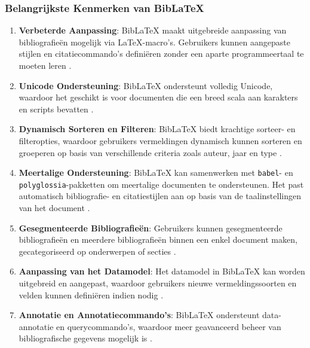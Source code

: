 \subsubsection{Belangrijkste Kenmerken van BibLaTeX}
\begin{enumerate}
    \item \textbf{Verbeterde Aanpassing}: BibLaTeX maakt uitgebreide aanpassing van bibliografieën mogelijk via \LaTeX{}-macro's. Gebruikers kunnen aangepaste stijlen en citatiecommando's definiëren zonder een aparte programmeertaal te moeten leren \autocite{Kime2024}.
    \item \textbf{Unicode Ondersteuning}: BibLaTeX ondersteunt volledig Unicode, waardoor het geschikt is voor documenten die een breed scala aan karakters en scripts bevatten \autocite{Kime2024}.
    \item \textbf{Dynamisch Sorteren en Filteren}: BibLaTeX biedt krachtige sorteer- en filteropties, waardoor gebruikers vermeldingen dynamisch kunnen sorteren en groeperen op basis van verschillende criteria zoals auteur, jaar en type \autocite{Kime2024}.
    \item \textbf{Meertalige Ondersteuning}: BibLaTeX kan samenwerken met \texttt{babel}- en \texttt{polyglossia}-pakketten om meertalige documenten te ondersteunen. Het past automatisch bibliografie- en citatiestijlen aan op basis van de taalinstellingen van het document \autocite{Kime2024}.
    \item \textbf{Gesegmenteerde Bibliografieën}: Gebruikers kunnen gesegmenteerde bibliografieën en meerdere bibliografieën binnen een enkel document maken, gecategoriseerd op onderwerpen of secties \autocite{Kime2024}.
    \item \textbf{Aanpassing van het Datamodel}: Het datamodel in BibLaTeX kan worden uitgebreid en aangepast, waardoor gebruikers nieuwe vermeldingssoorten en velden kunnen definiëren indien nodig \autocite{Kime2024}.
    \item \textbf{Annotatie en Annotatiecommando's}: BibLaTeX ondersteunt data-annotatie en querycommando's, waardoor meer geavanceerd beheer van bibliografische gegevens mogelijk is \autocite{Kime2024}.
\end{enumerate}

